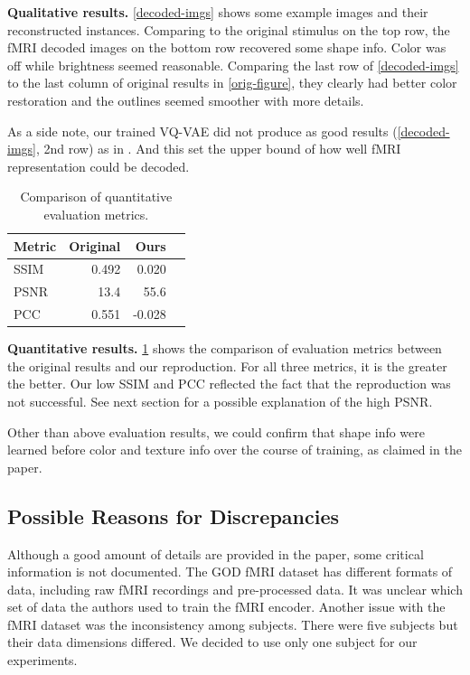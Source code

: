 \documentclass{article}
\theoremstyle{plain}
\theoremstyle{definition}
\theoremstyle{remark}
\begin{document}
\textbf{Qualitative results.} \cref{decoded-imgs} shows some example images and their reconstructed instances. Comparing to the original stimulus on the top row, the fMRI decoded  images on the bottom row recovered some shape info. Color was off while brightness seemed reasonable.
Comparing the last row of \cref{decoded-imgs} to the last column of original results in \cref{orig-figure}, they clearly had better color restoration and the outlines seemed smoother with more details.

As a side note, our trained VQ-VAE did not produce as good results (\cref{decoded-imgs}, 2nd row) as in \cite{oordNeuralDiscreteRepresentation2018}. And this set the upper bound of how well fMRI representation could be decoded.

\begin{table}[b]
\caption{Comparison of quantitative evaluation metrics.}
\label{metric-table}
\vskip 0.15in
\begin{center}
\begin{small}
\begin{sc}
\begin{tabular}{lrrc}
\toprule
Metric & Original & Ours \\
\midrule
SSIM    & 0.492 & 0.020 \\
PSNR    & 13.4 &  55.6 \\
PCC     & 0.551 & -0.028 \\
\bottomrule
\end{tabular}
\end{sc}
\end{small}
\end{center}
\vskip -0.1in
\end{table}

\textbf{Quantitative results.} \cref{metric-table} shows the comparison of evaluation metrics between the original results and our reproduction. For all three metrics, it is the greater the better. Our low SSIM and PCC reflected the fact that the reproduction was not successful. See next section for a possible explanation of the high PSNR.

\medskip

Other than above evaluation results, we could confirm that shape info were learned before color and texture info over the course of training, as claimed in the paper.


\subsection{Possible Reasons for Discrepancies}
Although a good amount of details are provided in the paper, some critical information is not documented. The GOD fMRI dataset \cite{horikawa2016} has different formats of data, including raw fMRI recordings and pre-processed data. It was unclear which set of data the authors used to train the fMRI encoder. Another issue with the fMRI dataset was the inconsistency among subjects. There were five subjects but their data dimensions differed. We decided to use only one subject for our experiments.
\end{document}
